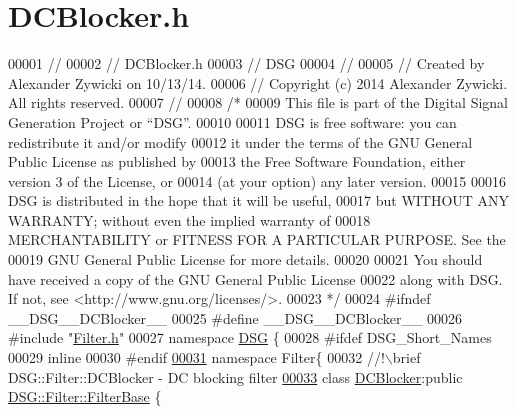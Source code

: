 \hypertarget{_d_c_blocker_8h_source}{\section{D\+C\+Blocker.\+h}
\label{_d_c_blocker_8h_source}
}

\begin{DoxyCode}
00001 \textcolor{comment}{//}
00002 \textcolor{comment}{//  DCBlocker.h}
00003 \textcolor{comment}{//  DSG}
00004 \textcolor{comment}{//}
00005 \textcolor{comment}{//  Created by Alexander Zywicki on 10/13/14.}
00006 \textcolor{comment}{//  Copyright (c) 2014 Alexander Zywicki. All rights reserved.}
00007 \textcolor{comment}{//}
00008 \textcolor{comment}{/*}
00009 \textcolor{comment}{ This file is part of the Digital Signal Generation Project or “DSG”.}
00010 \textcolor{comment}{}
00011 \textcolor{comment}{ DSG is free software: you can redistribute it and/or modify}
00012 \textcolor{comment}{ it under the terms of the GNU General Public License as published by}
00013 \textcolor{comment}{ the Free Software Foundation, either version 3 of the License, or}
00014 \textcolor{comment}{ (at your option) any later version.}
00015 \textcolor{comment}{}
00016 \textcolor{comment}{ DSG is distributed in the hope that it will be useful,}
00017 \textcolor{comment}{ but WITHOUT ANY WARRANTY; without even the implied warranty of}
00018 \textcolor{comment}{ MERCHANTABILITY or FITNESS FOR A PARTICULAR PURPOSE.  See the}
00019 \textcolor{comment}{ GNU General Public License for more details.}
00020 \textcolor{comment}{}
00021 \textcolor{comment}{ You should have received a copy of the GNU General Public License}
00022 \textcolor{comment}{ along with DSG.  If not, see <http://www.gnu.org/licenses/>.}
00023 \textcolor{comment}{ */}
00024 \textcolor{preprocessor}{#ifndef \_\_DSG\_\_DCBlocker\_\_}
00025 \textcolor{preprocessor}{#define \_\_DSG\_\_DCBlocker\_\_}
00026 \textcolor{preprocessor}{#include "\hyperlink{_filter_8h}{Filter.h}"}
00027 \textcolor{keyword}{namespace }\hyperlink{namespace_d_s_g}{DSG} \{
00028 \textcolor{preprocessor}{#ifdef DSG\_Short\_Names}
00029     \textcolor{keyword}{inline}
00030 \textcolor{preprocessor}{#endif}
\hypertarget{_d_c_blocker_8h_source_l00031}{}\hyperlink{namespace_d_s_g_1_1_filter}{00031}     \textcolor{keyword}{namespace }Filter\{\textcolor{comment}{}
00032 \textcolor{comment}{        //!\(\backslash\)brief DSG::Filter::DCBlocker - DC blocking filter}
\hypertarget{_d_c_blocker_8h_source_l00033}{}\hyperlink{class_d_s_g_1_1_filter_1_1_d_c_blocker}{00033} \textcolor{comment}{}        \textcolor{keyword}{class }\hyperlink{class_d_s_g_1_1_filter_1_1_d_c_blocker}{DCBlocker}:\textcolor{keyword}{public} \hyperlink{class_d_s_g_1_1_filter_1_1_filter_base}{DSG::Filter::FilterBase} \{

\end{DoxyCode}
